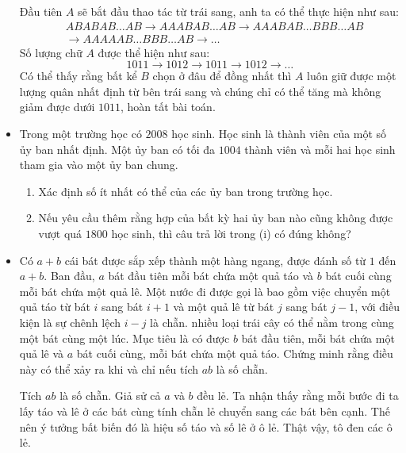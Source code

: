 \documentclass[11pt]{scrartcl}
\begin{document}
\begin{itemize}[label=, leftmargin=0em, itemsep=0.5em]
\begin{sol}
        Đầu tiên $A$ sẽ bắt đầu thao tác từ trái sang, anh ta có thể thực hiện như sau:
        \[
            \begin{aligned}
                &ABABAB\dots AB \to AAABAB\dots AB \to AAABAB\dots BBB\dots AB\\
                &\to AAAAAB\dots BBB \dots AB \to \dots
            \end{aligned}
        \]
        Số lượng chữ $A$ được thể hiện như sau:
        \[
            1011 \to 1012 \to 1011 \to 1012 \to\dots
        \]
        Có thể thấy rằng bất kể $B$ chọn ở đâu để đồng nhất thì $A$ luôn giữ được một lượng quân nhất định từ bên trái sang và chúng chỉ có thể tăng mà không giảm được dưới $1011$, hoàn tất bài toán.
    \end{sol}


    \item \begin{btvn}
        Trong một trường học có $2008$ học sinh. Học sinh là thành viên của một số ủy ban nhất định. Một ủy ban có tối đa $1004$ thành viên và mỗi hai học sinh tham gia vào một ủy ban chung.
        \begin{enumerate}
            \item Xác định số ít nhất có thể của các ủy ban trong trường học.
            \item Nếu yêu cầu thêm rằng hợp của bất kỳ hai ủy ban nào cũng không được vượt quá $1800$ học sinh, thì câu trả lời trong (i) có đúng không?
        \end{enumerate}
    \end{btvn}

    \item \begin{bt}
        Có $a+b$ cái bát được sắp xếp thành một hàng ngang, được đánh số từ $1$ đến $a+b$. Ban đầu, $a$ bát đầu tiên mỗi bát chứa một quả táo và $b$ bát cuối cùng mỗi bát chứa một quả lê.
        Một nước đi được gọi là  bao gồm việc chuyển một quả táo từ bát $i$ sang bát $i+1$ và một quả lê từ bát $j$ sang bát $j-1$, với điều kiện là sự chênh lệch $i-j$ là chẵn. nhiều loại trái cây có thể nằm trong cùng một bát cùng một lúc. Mục tiêu là có được $b$ bát đầu tiên, mỗi bát chứa một quả lê và $a$ bát cuối cùng, mỗi bát chứa một quả táo. Chứng minh rằng điều này có thể xảy ra khi và chỉ nếu tích $ab$ là số chẵn.
    \end{bt}
    \begin{sol}
         Tích $ab$ là số chẵn. Giả sử cả $a$ và $b$ đều lẻ. Ta nhận thấy rằng mỗi bước đi ta lấy táo và lê ở các bát cùng tính chẵn lẻ chuyển sang các bát bên cạnh. Thế nên ý tưởng bất biến đó là hiệu số táo và số lê ở ô lẻ. Thật vậy, tô đen các ô lẻ. 
        

\end{sol}
\end{itemize}
\end{document}

